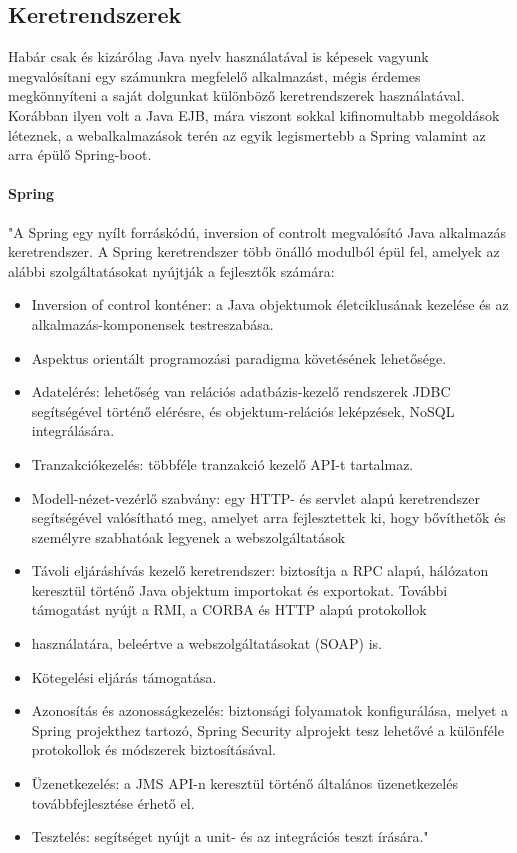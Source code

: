 \subsection{Keretrendszerek}

Habár csak és kizárólag Java nyelv használatával is képesek vagyunk megvalósítani egy számunkra megfelelő alkalmazást, mégis érdemes megkönnyíteni a saját dolgunkat különböző keretrendszerek használatával. Korábban ilyen volt a Java EJB, mára viszont sokkal kifinomultabb megoldások léteznek, a webalkalmazások terén az egyik legismertebb a Spring valamint az arra épülő Spring-boot.

\paragraph{Spring}

"A Spring egy nyílt forráskódú, inversion of controlt megvalósító Java alkalmazás keretrendszer.
A Spring keretrendszer több önálló modulból épül fel, amelyek az alábbi szolgáltatásokat nyújtják a fejlesztők számára:

\begin{itemize}
	\item Inversion of control konténer: a Java objektumok életciklusának kezelése és az alkalmazás-komponensek testreszabása.
	\item Aspektus orientált programozási paradigma követésének lehetősége.
	\item Adatelérés: lehetőség van relációs adatbázis-kezelő rendszerek JDBC segítségével történő elérésre, és objektum-relációs leképzések, NoSQL integrálására.
	\item Tranzakciókezelés: többféle tranzakció kezelő API-t tartalmaz.
	\item Modell-nézet-vezérlő szabvány: egy HTTP- és servlet alapú keretrendszer segítségével valósítható meg, amelyet arra fejlesztettek ki, hogy bővíthetők és személyre szabhatóak legyenek a webszolgáltatások
	\item Távoli eljáráshívás kezelő keretrendszer: biztosítja a RPC alapú, hálózaton keresztül történő Java objektum importokat és exportokat. További támogatást nyújt a RMI, a CORBA és HTTP alapú protokollok \item használatára, beleértve a webszolgáltatásokat (SOAP) is.
	\item Kötegelési eljárás támogatása.
	\item Azonosítás és azonosságkezelés: biztonsági folyamatok konfigurálása, melyet a Spring projekthez tartozó, Spring Security alprojekt tesz lehetővé a különféle protokollok és módszerek biztosításával.
	\item Üzenetkezelés: a JMS API-n keresztül történő általános üzenetkezelés továbbfejlesztése érhető el.
	\item Tesztelés: segítséget nyújt a unit- és az integrációs teszt írására."\cite{spring}
\end{itemize}

